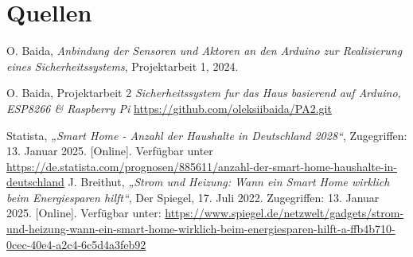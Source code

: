 \documentclass[12pt, letterpaper]{article}
\begin{document}
\section{Quellen}
\begin{thebibliography}{20}
  O. Baida,
  \textit{Anbindung der Sensoren und Aktoren an den Arduino zur Realisierung eines Sicherheitssystems},
  Projektarbeit 1, 2024.

  O. Baida, Projektarbeit 2 \textit{Sicherheitssystem fur das Haus basierend auf Arduino, ESP8266 \& Raspberry Pi} \url{https://github.com/oleksiibaida/PA2.git}
  
  Statista, \textit{„Smart Home - Anzahl der Haushalte in Deutschland 2028“}, Zugegriffen: 13. Januar 2025. [Online]. Verfügbar unter \url{https://de.statista.com/prognosen/885611/anzahl-der-smart-home-haushalte-in-deutschland}
  J. Breithut, \textit{„Strom und Heizung: Wann ein Smart Home wirklich beim Energiesparen hilft“}, Der Spiegel, 17. Juli 2022. Zugegriffen: 13. Januar 2025. [Online]. Verfügbar unter: \url{https://www.spiegel.de/netzwelt/gadgets/strom-und-heizung-wann-ein-smart-home-wirklich-beim-energiesparen-hilft-a-ffb4b710-0cec-40e4-a2c4-6c5d4a3feb92}



\end{thebibliography}
\end{document}
